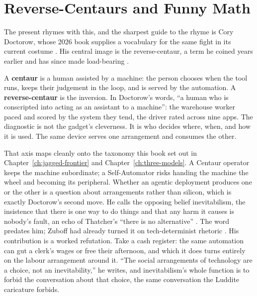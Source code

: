 \section{Reverse-Centaurs and Funny Math}

The present rhymes with this, and the sharpest guide to the rhyme is Cory Doctorow, whose 2026 book supplies a vocabulary for the same fight in its current costume \parencite{Doctorow2026ReverseCentaur}. His central image is the reverse-centaur, a term he coined years earlier and has since made load-bearing \parencite{Doctorow2021ReverseCentaur}.

\begin{definitionbox}[title={Centaur and Reverse-Centaur}]
A \textbf{centaur} is a human assisted by a machine: the person chooses when the tool runs, keeps their judgement in the loop, and is served by the automation. A \textbf{reverse-centaur} is the inversion. In Doctorow's words, ``a human who is conscripted into acting as an assistant to a machine'': the warehouse worker paced and scored by the system they tend, the driver rated across nine apps. The diagnostic is not the gadget's cleverness. It is who decides where, when, and how it is used. The same device serves one arrangement and consumes the other.
\end{definitionbox}

That axis maps cleanly onto the taxonomy this book set out in Chapter~\ref{ch:jagged-frontier} and Chapter~\ref{ch:three-models}. A Centaur operator keeps the machine subordinate; a Self-Automator risks handing the machine the wheel and becoming its peripheral. Whether an agentic deployment produces one or the other is a question about arrangements rather than silicon, which is exactly Doctorow's second move. He calls the opposing belief inevitabilism, the insistence that there is one way to do things and that any harm it causes is nobody's fault, an echo of Thatcher's ``there is no alternative'' \parencite{Doctorow2023Neoliberalism}. The word predates him; Zuboff had already turned it on tech-determinist rhetoric \parencite{Zuboff2019SurveillanceCapitalism}. His contribution is a worked refutation. Take a cash register: the same automation can gut a clerk's wages or free their afternoon, and which it does turns entirely on the labour arrangement around it. ``The social arrangements of technology are a choice, not an inevitability,'' he writes, and inevitabilism's whole function is to forbid the conversation about that choice, the same conversation the Luddite caricature forbids.

